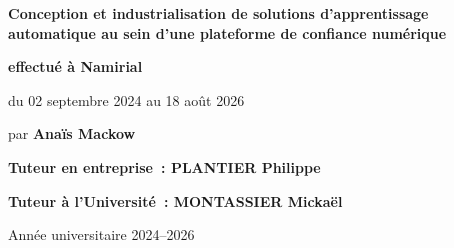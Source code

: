 \begin{titlepage}
{\LARGE\bfseries
  Conception et industrialisation de solutions d'apprentissage automatique au sein d'une plateforme de confiance numérique\par}

\vspace{2cm}

{\large\bfseries effectué à \mbox{Namirial}\par}
\vspace{0.3cm}
{\large du 02 septembre 2024 au 18 août 2026\par}
\vspace{0.3cm}
{\large par \textbf{Anaïs Mackow}\par}

\vspace{2cm}

{\large\bfseries Tuteur en entreprise~: PLANTIER Philippe\par}
\vspace{0.3cm}
{\large\bfseries Tuteur à l'Université~: MONTASSIER Mickaël\par}

\vfill


\vspace{0.5cm}
{\normalsize Année universitaire 2024--2026\par}

\end{titlepage}
